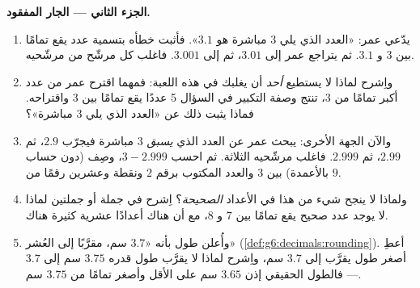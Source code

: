 \begin{problem}
\medskip
\noindent\textbf{الجزء الثاني --- الجار المفقود.}
\begin{enumerate}[resume]
  \item يدّعي عمر: «العدد الذي يلي $3$ مباشرة هو $3.1$». فأثبت
        خطأه بتسمية عدد يقع تمامًا بين $3$ و
        $3.1$. ثم يتراجع عمر إلى $3.01$، ثم إلى $3.001$. فاغلب كل
        مرشّح من مرشّحيه.
  \item واِشرح لماذا لا يستطيع \emph{أحد} أن يغلبك في هذه اللعبة:
        فمهما اقترح عمر من عدد أكبر تمامًا من $3$،
        تنتج وصفة التكبير في السؤال 5 عددًا يقع تمامًا
        بين $3$ واقتراحه. فماذا يثبت ذلك عن
        «العدد الذي يلي $3$ مباشرة»؟
  \item والآن الجهة الأخرى: يبحث عمر عن العدد الذي
        \emph{يسبق} $3$ مباشرة فيجرّب $2.9$، ثم $2.99$، ثم
        $2.999$. فاغلب مرشّحيه الثلاثة. ثم احسب
        $3 - 2.999$، وصِف (دون حساب بالأعمدة)
         بين $3$ والعدد المكتوب برقم
        $2$ ونقطة وعشرين رقمًا من $9$.
  \item ولماذا لا ينجح شيء من هذا في الأعداد \emph{الصحيحة}؟
        اِشرح في جملة أو جملتين لماذا لا يوجد عدد
        صحيح يقع تمامًا بين $7$ و $8$، مع أن هناك
        أعدادًا عشرية كثيرة هناك.
  \item وأُعلن طول بأنه «$3.7$ سم، مقرَّبًا إلى
        العُشر» (\cref{def:g6:decimals:rounding}). أعطِ
        أصغر طول يقرَّب إلى $3.7$ سم، واِشرح لماذا
        لا يقرَّب طول قدره $3.75$ سم إلى $3.7$ ---
        فالطول الحقيقي إذن $3.65$ سم على الأقل وأصغر تمامًا
        من $3.75$ سم.
\end{enumerate}


\end{problem}
